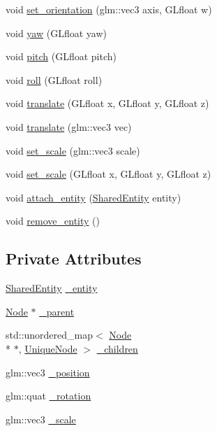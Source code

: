\begin{DoxyCompactItemize}
void \hyperlink{classLarp_1_1Node_a0d5e761af674c2c547e8638b91a2a85b}{set\-\_\-orientation} (glm\-::vec3 axis, G\-Lfloat w)
\item 
void \hyperlink{classLarp_1_1Node_a829a3cf29a5f165f7d771cc283f25053}{yaw} (G\-Lfloat yaw)
\item 
void \hyperlink{classLarp_1_1Node_ad8f8390e764a96398d080538c437c7ee}{pitch} (G\-Lfloat pitch)
\item 
void \hyperlink{classLarp_1_1Node_a1c839a3075f1e97aa368ba8212c50ee7}{roll} (G\-Lfloat roll)
\item 
void \hyperlink{classLarp_1_1Node_aa0186c5d77b58e2d7ede02dec0f2cdc4}{translate} (G\-Lfloat x, G\-Lfloat y, G\-Lfloat z)
\item 
void \hyperlink{classLarp_1_1Node_a7494be4e04c8f5911aedeeb41c27993b}{translate} (glm\-::vec3 vec)
\item 
void \hyperlink{classLarp_1_1Node_a20048e6f1487b9e6bdb5e2f66794de65}{set\-\_\-scale} (glm\-::vec3 scale)
\item 
void \hyperlink{classLarp_1_1Node_aa212fa28bc6cc6df4ded2a487fd591eb}{set\-\_\-scale} (G\-Lfloat x, G\-Lfloat y, G\-Lfloat z)
\item 
void \hyperlink{classLarp_1_1Node_aa48fabf718331c31dc1b1239853cfe09}{attach\-\_\-entity} (\hyperlink{namespaceLarp_ae3ffca1f126e4263cbdc59b116ee465a}{Shared\-Entity} entity)
\item 
void \hyperlink{classLarp_1_1Node_a390c52314f7cb0f27244994aba34dc10}{remove\-\_\-entity} ()
\end{DoxyCompactItemize}
\subsection*{Private Attributes}
\begin{DoxyCompactItemize}
\item 
\hyperlink{namespaceLarp_ae3ffca1f126e4263cbdc59b116ee465a}{Shared\-Entity} \hyperlink{classLarp_1_1Node_ab313f78673bfed1596bb1679aec92326}{\-\_\-entity}
\item 
\hyperlink{classLarp_1_1Node}{Node} $\ast$ \hyperlink{classLarp_1_1Node_affe541c1eca6c4d1863c4d8aca13ea86}{\-\_\-parent}
\item 
std\-::unordered\-\_\-map$<$ \hyperlink{classLarp_1_1Node}{Node} \\*
$\ast$, \hyperlink{namespaceLarp_ad95a88bc34f8c78cefd64c9bbeb94a58}{Unique\-Node} $>$ \hyperlink{classLarp_1_1Node_a583f7c56966cb7df1759fb42116166f7}{\-\_\-children}
\item 
glm\-::vec3 \hyperlink{classLarp_1_1Node_a060f49eb175b70c9e0da515fa685f1f2}{\-\_\-position}
\item 
glm\-::quat \hyperlink{classLarp_1_1Node_a3bf60bf55c2cda89031f9327fafa0d17}{\-\_\-rotation}
\item 
glm\-::vec3 \hyperlink{classLarp_1_1Node_ae295b7db9065cd5bcc1edb32af6e7987}{\-\_\-scale}
\end{DoxyCompactItemize}


